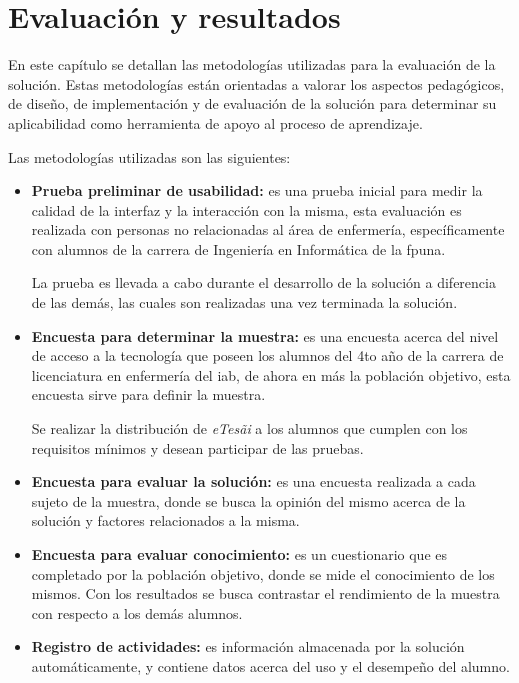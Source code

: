 \chapter{Evaluación y resultados}
\label{chap:evaluacion}


En este capítulo se detallan las metodologías utilizadas para la evaluación de la 
solución. Estas metodologías están orientadas a valorar los 
aspectos pedagógicos, de diseño, de implementación y de evaluación de la solución 
para determinar su aplicabilidad como herramienta de apoyo al proceso de 
aprendizaje.

Las metodologías utilizadas son las siguientes:

\begin{itemize}

    \item \textbf{Prueba preliminar de usabilidad:} es una prueba inicial para
        medir la calidad de la interfaz y la interacción con la misma, esta
        evaluación es realizada con personas no relacionadas al área de
        enfermería, específicamente con alumnos de la carrera de
        Ingeniería en Informática de la \gls{fpuna}.

        La prueba es llevada a cabo durante el desarrollo de la solución a
        diferencia de las demás, las cuales son realizadas una vez terminada la
        solución.

    \item \textbf{Encuesta para determinar la muestra:} es una encuesta acerca del nivel de
        acceso a la tecnología que poseen los alumnos del 4to año  de la carrera 
        de licenciatura en enfermería del \Gls{iab},
        de ahora en más la población objetivo, esta encuesta sirve para definir
        la muestra.

        Se realizar la distribución de \textit{eTes\~{a}i} a los
        alumnos que cumplen con los requisitos mínimos y desean participar de
        las pruebas.

    \item \textbf{Encuesta para evaluar la solución:} es una encuesta realizada
        a cada sujeto de la muestra, donde se busca la opinión del mismo acerca
        de la solución y factores relacionados a la misma. 

    \item \textbf{Encuesta para evaluar conocimiento:} es un cuestionario que es
        completado por la población objetivo, donde se mide el conocimiento de
        los mismos. Con los resultados se busca contrastar el rendimiento de la muestra 
        con respecto a los demás alumnos.
        
    \item \textbf{Registro de actividades:} es información almacenada por la
        solución automáticamente, y contiene datos acerca del uso y el desempeño
        del alumno.
        
\end{itemize}

